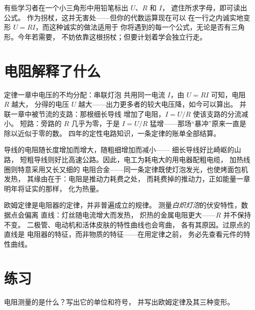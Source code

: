 \begin{remark}[三角辅助记法]\label{rem:g8:ohms-law:triangle}
有些学习者在一个小三角形中用铅笔标出 $U$、$R$ 和 $I$，
遮住所求字母，即可读出公式。
作为拐杖，这并无害处——但你的代数运算现在可以
在一行之内诚实地变形 $U = R I$，而这种诚实的做法适用于
你将遇到的每一个公式，无论是否有三角形。今年若需要，
不妨依靠这根拐杖；但要计划着学会独立行走。
\end{remark}

\section{电阻解释了什么}

\begin{example}\label{ex:g8:ohms-law:mysteries}
定律一章中电压的不均分配：串联灯泡
共用同一电流 $I$，由 $U = R I$ 可知，电阻 $R$ 越大，
分得的电压 $U$ 越大——出力更多者的较大电压降，如今可以算出。
并联一章中被节流的支路：那根细长导线
增加了电阻，$I = U/R$ 使该支路的分流减小。
短路：旁路的 $R$ 几乎为零，于是 $I = U/R$
猛增——那场“暴冲”原来一直是除以近似于零的数。
四年的定性电路知识，一条定律的账单全部结算。
\end{example}

\begin{example}\label{ex:g8:ohms-law:wires}
导线的电阻随长度增加而增大，随粗细增加而减小——
细长导线好比崎岖的山路，
短粗导线则好比高速公路。因此，电工为耗电大的用电器配粗电缆，
加热线圈则特意采用又长又细的
电阻合金——同一条定律既使灯泡发光，也使烤面包机发热，
其缘由在于：电阻是推动力耗费之处，
而耗费掉的推动力，正如能量一章明年将证实的那样，
化为热量。
\end{example}

\begin{remark}[定律的适用范围]\label{rem:g8:ohms-law:limits}
欧姆定律是电阻器的定律，并非普遍成立的规律。
测量\emph{白炽灯泡}的伏安特性，数据点会偏离
直线：灯丝随电流增大而发热，
炽热的金属电阻更大——$R$ 并不保持不变。
二极管、电动机和活体皮肤的特性曲线也会弯曲，
各有其原因。过原点的直线是
电阻器的特征，而非物质的特征——在用定律之前，
务必先查看元件的特性曲线。
\end{remark}

\section{练习}

\begin{exercise}[$\star$]\label{exo:g8:ohms-law:1}
电阻测量的是什么？写出它的单位和符号，
并写出欧姆定律及其三种变形。
\end{exercise}

